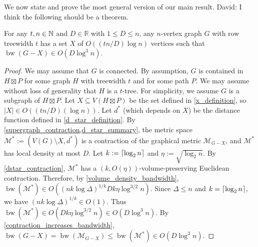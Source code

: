 \documentclass{patmorin}
\renewcommand{\le}{\leqslant}
\renewcommand{\leq}{\leqslant}
\newcommand{\david}[1]{{\color{orange} David: #1}}
\DeclareMathOperator{\bw}{bw}
\begin{document}


We now state and prove the most general version of our main result.
\david{I think the following should be a theorem.}

\begin{lem}
\label{main_thm_products_D}
For any $t,n\in\mathbb{N}$ and $D\in\mathbb{R}$ with $1\leq D\leq n$, any $n$-vertex graph $G$ with row treewidth $t$ has a set $X$ of $O((tn/D)\log n)$ vertices such that $\bw(G-X)\in O(D\log^3 n)$.
\end{lem}

\begin{proof}
We may assume that $G$ is connected.
By assumption, $G$ is contained in $H\boxtimes P$ for some graph $H$ with treewidth $t$ and for some path $P$.
We may assume without loss of generality that $H$ is a $t$-tree. For simplicity, we assume $G$ is a subgraph of $H\boxtimes P$. Let $X\subseteq V(H\boxtimes P)$ be the set defined in \cref{x_definition}, so $|X|\in O((tn/D)(\log n))$. Let $d^*$ (which depends on $X$) be the distance function defined in \cref{d_star_definition}.  By \cref{supergraph_contraction,d_star_summary}, the metric space $\mathcal{M}^*:=(V(G)\setminus X,d^*)$ is a contraction of the graphical metric $\mathcal{M}_{G-X}$, and
$\mathcal{M}^*$ has local density at most $D$. Let $k:={\lceil \log_2n \rceil}$ and $\eta:=\sqrt{\log_2 n}$.
By \cref{dstar_contraction}, $\mathcal{M}^*$ has a $(k,O(\eta))$-volume-preserving Euclidean contraction.  Therefore, by \cref{volume_density_bandwidth}, $\bw(\mathcal{M}^*)\in
O( (nk\log\Delta)^{1/k} Dk\eta \log^{3/2} n)$.
Since $\Delta\leq n$ and $k={\lceil \log_2n \rceil}$, we have
$(nk\log\Delta)^{1/k}\in O(1)$.
Thus
$\bw(\mathcal{M}^*)\in O(  Dk\eta \log^{3/2} n) \in O(D\log^3 n)$.
By \cref{contraction_increases_bandwidth}, $\bw(G-X) =\bw(\mathcal{M}_{G-X})\le \bw(\mathcal{M}^*) \in
O(D\log^3 n)$.
\end{proof}
\end{document}
